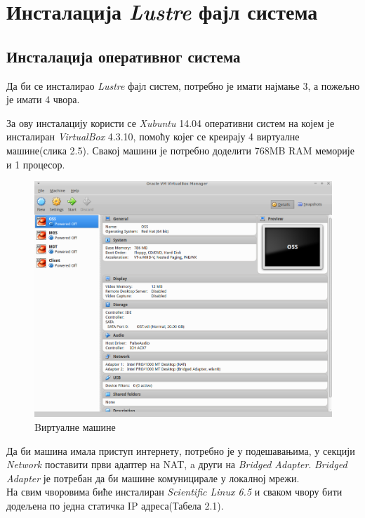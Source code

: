 \section{Инсталација   \textit{Lustre} фајл система}
\subsection{Инсталација оперативног система}

Да би се инсталирао \textit{Lustre} фајл систем, потребно је имати најмање 3, а пожељно је имати 4 чвора. 

За ову инсталацију користи се \textit{Xubuntu} 14.04 оперативни систем на којем је инсталиран \textit{VirtualBox} 4.3.10, помоћу којег се креирају 4 виртуалне машине(слика 2.5). Свакој машини је потребно доделити 768MB RAM меморије и 1 процесор.
\begin{figure}[h!]
  \centering
      \includegraphics[width=1\textwidth]{slike/virtualbox.png}
  \caption{Bиртуалне машине}
\end{figure}
Да би машина имала приступ интернету, потребно је у подешавањима, у секцији \textit{Network} поставити први адаптер на \gls{NAT}, a други на \textit{Bridged Adapter}. 	\textit{Bridged Adapter} је потребан да би машине комуницирале у локалној мрежи.
~\\[3cm]
На свим чворовима биће инсталиран \textit{Scientific Linux 6.5} и сваком чвору бити додељена по једна статичка IP адреса(Табела 2.1).
